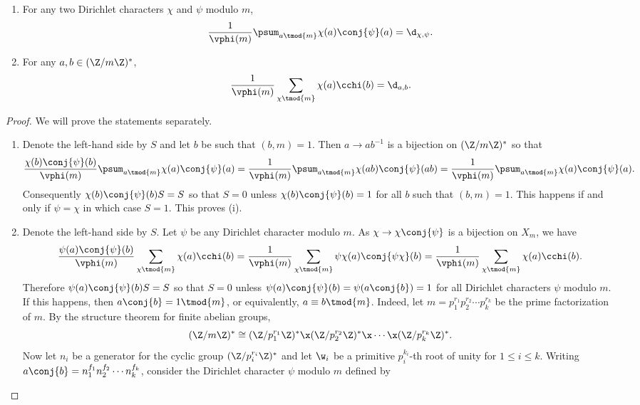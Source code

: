     \begin{proposition}\label{prop:Dirichlet_orthogonality_relations}
    \phantom{ }
      \begin{enumerate}[label=(\roman*)]
        \item For any two Dirichlet characters $\chi$ and $\psi$ modulo $m$,
        \[
          \frac{1}{\vphi(m)}\psum_{a \tmod{m}}\chi(a)\conj{\psi}(a) = \d_{\chi,\psi}.
        \]
        \item For any $a,b \in (\Z/m\Z)^{\ast}$,
        \[
          \frac{1}{\vphi(m)}\sum_{\chi \tmod{m}}\chi(a)\cchi(b) = \d_{a,b}.
        \]
      \end{enumerate}
    \end{proposition}
    \begin{proof}
      We will prove the statements separately.
      \begin{enumerate}[label=(\roman*)]
        \item Denote the left-hand side by $S$ and let $b$ be such that $(b,m) = 1$. Then $a \to ab^{-1}$ is a bijection on $(\Z/m\Z)^{\ast}$ so that
        \[
          \frac{\chi(b)\conj{\psi}(b)}{\vphi(m)}\psum_{a \tmod{m}}\chi(a)\conj{\psi}(a) = \frac{1}{\vphi(m)}\psum_{a \tmod{m}}\chi(ab)\conj{\psi}(ab) = \frac{1}{\vphi(m)}\psum_{a \tmod{m}}\chi(a)\conj{\psi}(a).
        \]
        Consequently $\chi(b)\conj{\psi}(b)S = S$ so that $S = 0$ unless $\chi(b)\conj{\psi}(b) = 1$ for all $b$ such that $(b,m) = 1$. This happens if and only if $\psi = \chi$ in which case $S = 1$. This proves (i).
        \item Denote the left-hand side by $S$. Let $\psi$ be any Dirichlet character modulo $m$. As $\chi \to \chi\conj{\psi}$ is a bijection on $X_{m}$, we have
        \[
          \frac{\psi(a)\conj{\psi}(b)}{\vphi(m)}\sum_{\chi \tmod{m}}\chi(a)\cchi(b) = \frac{1}{\vphi(m)}\sum_{\chi \tmod{m}}\psi\chi(a)\conj{\psi\chi}(b) = \frac{1}{\vphi(m)}\sum_{\chi \tmod{m}}\chi(a)\cchi(b).
        \]
        Therefore $\psi(a)\conj{\psi}(b)S = S$ so that $S = 0$ unless $\psi(a)\conj{\psi}(b) = \psi(a\conj{b}) = 1$ for all Dirichlet characters $\psi$ modulo $m$. If this happens, then $a\conj{b} = 1 \tmod{m}$, or equivalently, $a \equiv b \tmod{m}$. Indeed, let $m = p_{1}^{r_{1}}p_{2}^{r_{2}} \cdots p_{k}^{r_{k}}$ be the prime factorization of $m$. By the structure theorem for finite abelian groups,
        \[
          (\Z/m\Z)^{\ast} \cong (\Z/p_{1}^{r_{1}}\Z)^{\ast} \x (\Z/p_{2}^{r_{2}}\Z)^{\ast} \x \cdots \x (\Z/p_{k}^{r_{k}}\Z)^{\ast}.
        \]
        Now let $n_{i}$ be a generator for the cyclic group $(\Z/p_{i}^{r_{i}}\Z)^{\ast}$ and let $\w_{i}$ be a primitive $p_{i}^{k_{i}}$-th root of unity for $1 \le i \le k$. Writing $a\conj{b} = n_{1}^{f_{1}}n_{2}^{f_{2}} \cdots n_{k}^{f_{k}}$, consider the Dirichlet character $\psi$ modulo $m$ defined by

\end{enumerate}
\end{proof}
